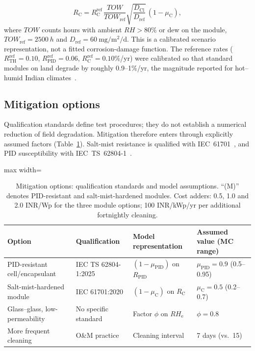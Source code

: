\documentclass[preprint,11pt]{elsarticle}
\newcommand{\RHe}{\mathit{RH}_{\mathrm{e}}}
\newcommand{\TOWsym}{\mathit{TOW}}
\begin{document}
\begin{equation}
R_{\mathrm{C}} = R_{\mathrm{C}}^{\mathrm{ref}}\,\frac{\TOWsym}{\TOWsym_{\mathrm{ref}}}
\sqrt{\frac{D_{\mathrm{Cl}}}{D_{\mathrm{ref}}}}\,(1-\mu_{\mathrm{C}}),
\label{eq:corr}
\end{equation}
where $\TOWsym$ counts hours with ambient $\mathit{RH}>80\%$ or dew on the module, $\TOWsym_{\mathrm{ref}}=\SI{2500}{h}$
and $D_{\mathrm{ref}}=\SI{60}{\milli\gram\per\square\metre\per\day}$. This is a calibrated scenario representation, not a
fitted corrosion-damage function. The reference rates ($R_{\mathrm{TH}}^{\mathrm{ref}}=0.10$,
$R_{\mathrm{PID}}^{\mathrm{ref}}=0.06$, $R_{\mathrm{C}}^{\mathrm{ref}}=0.10$\%/yr) were calibrated so that standard
modules on land degrade by roughly 0.9--1\%/yr, the magnitude reported for hot--humid Indian
climates~\cite{dubey2014,jordan2013}.

\subsection{Mitigation options}\label{sec:mit}
Qualification standards define test procedures; they do not establish a numerical reduction of field degradation.
Mitigation therefore enters through explicitly assumed factors (Table~\ref{tab:mitstd}). Salt-mist resistance is
qualified with IEC~61701~\cite{iec61701}, and PID susceptibility with IEC~TS~62804-1~\cite{iec62804}.

\begin{table}[!t]
\caption{Mitigation options: qualification standards and model assumptions. ``(M)'' denotes PID-resistant and
salt-mist-hardened modules. Cost adders: 0.5, 1.0 and 2.0 INR/Wp for the three module options; 100 INR/kWp/yr per
additional fortnightly cleaning.}
\label{tab:mitstd}
\centering
\footnotesize
\begin{adjustbox}{max width=\textwidth}
\begin{tabular}{@{}p{30mm}p{24mm}p{36mm}p{30mm}@{}}
\toprule
Option & Qualification & Model representation & Assumed value (MC range) \\
\midrule
PID-resistant cell/encapsulant & IEC TS 62804-1:2025 & $(1-\mu_{\mathrm{PID}})$ on $R_{\mathrm{PID}}$ & $\mu_{\mathrm{PID}}=0.9$ (0.5--0.95) \\
Salt-mist-hardened module & IEC 61701:2020 & $(1-\mu_{\mathrm{C}})$ on $R_{\mathrm{C}}$ & $\mu_{\mathrm{C}}=0.5$ (0.2--0.7) \\
Glass--glass, low-permeability & No specific standard & Factor $\phi$ on $\RHe$ & $\phi=0.8$ \\
More frequent cleaning & O\&M practice & Cleaning interval & 7 days (vs.\ 15) \\
\bottomrule
\end{tabular}
\end{adjustbox}
\end{table}
\end{document}
